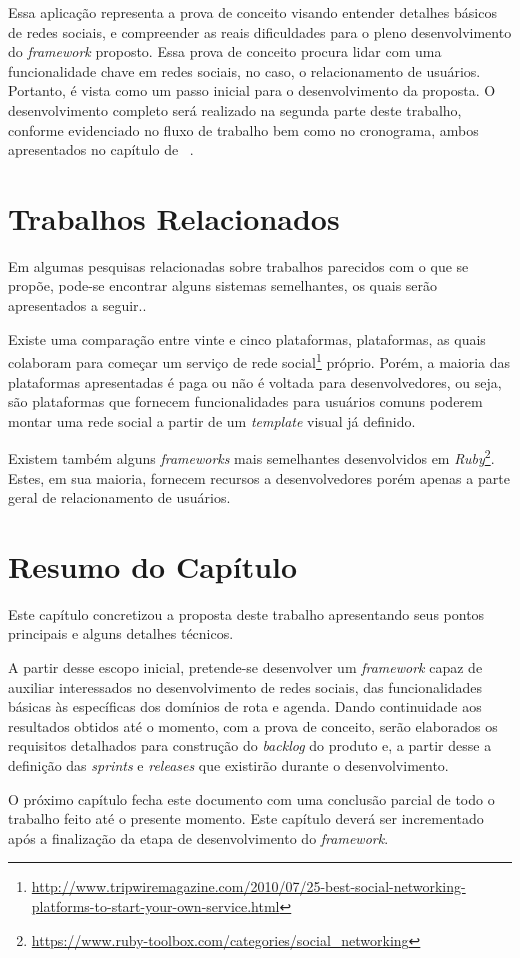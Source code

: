 Essa aplicação representa a prova de conceito visando entender detalhes básicos de redes sociais, e compreender as reais dificuldades para o pleno desenvolvimento do \textit{framework} proposto. Essa prova de conceito procura lidar com uma funcionalidade chave em redes sociais, no caso, o relacionamento de usuários. Portanto, é vista como um passo inicial para o desenvolvimento da proposta. O desenvolvimento completo será realizado na segunda parte deste trabalho, conforme evidenciado no fluxo de trabalho bem como no cronograma, ambos apresentados no capítulo de ~.

\section{Trabalhos Relacionados}

Em algumas pesquisas relacionadas sobre trabalhos parecidos com o que se propõe, pode-se encontrar alguns sistemas semelhantes, os quais serão apresentados a seguir..

Existe uma comparação entre vinte e cinco plataformas, plataformas, as quais colaboram para começar um serviço de rede social\footnote{\url{http://www.tripwiremagazine.com/2010/07/25-best-social-networking-platforms-to-start-your-own-service.html}}  próprio. Porém, a  maioria das plataformas apresentadas é paga ou não é voltada para desenvolvedores, ou seja, são plataformas que fornecem funcionalidades para usuários comuns poderem montar uma rede social a partir de um \textit{template} visual já definido.

Existem também alguns \textit{frameworks} mais semelhantes desenvolvidos em \textit{Ruby}\footnote{\url{https://www.ruby-toolbox.com/categories/social_networking}}. Estes, em sua maioria, fornecem recursos a desenvolvedores porém apenas a parte geral de relacionamento de usuários.

\section{Resumo do Capítulo}

Este capítulo concretizou a proposta deste trabalho apresentando seus pontos principais e alguns detalhes técnicos.

A partir desse escopo inicial, pretende-se desenvolver um \textit{framework}  capaz de auxiliar interessados no desenvolvimento de redes sociais, das funcionalidades básicas às específicas dos domínios de rota e agenda. Dando continuidade aos resultados obtidos até o momento, com a prova de conceito, serão elaborados os requisitos detalhados para construção do \textit{backlog} do produto e, a partir desse a definição das \textit{sprints} e \textit{releases} que existirão durante o desenvolvimento.

O próximo capítulo fecha este documento com uma conclusão parcial de todo o trabalho feito até o presente momento. Este capítulo deverá ser incrementado após a finalização da etapa de desenvolvimento do \textit{framework}.
